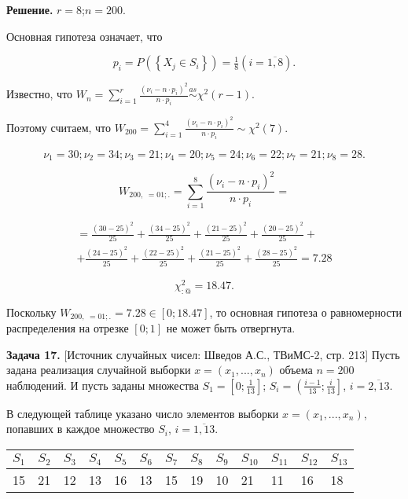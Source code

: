 \textbf{Решение.} $r=8$;$n=200$.

Основная гипотеза означает, что

\[p_{i} =P\left(\left\{X_{j} \in S_{i} \right\}\right)={\tfrac{1}{8}}  \left(i=\overline{1,8}\right).\] 

Известно, что $W_{n} =\sum _{i=1}^{r}\frac{\left(\nu _{i} -n\cdot p_{i} \right)^{2} }{n\cdot p_{i} }  \mathop{\sim }\limits^{as} \chi ^{2} \left(r-1\right)$.

Поэтому считаем, что $W_{200} =\sum _{i=1}^{4}\frac{\left(\nu _{i} -n\cdot p_{i} \right)^{2} }{n\cdot p_{i} }  \sim \chi ^{2} \left(7\right)$.

\[\nu _{1} =30; \nu _{2} =34; \nu _{3} =21; \nu _{4} =20; \nu _{5} =24; \nu _{6} =22; \nu _{7} =21; \nu _{8} =28.\] 



\[W_{200,\; =01;.} =\sum _{i=1}^{8}\frac{\left(\nu _{i} -n\cdot p_{i} \right)^{2} }{n\cdot p_{i} }  =\] 

\[\begin{array}{l} {=\frac{\left(30-25\right)^{2} }{25} +\frac{\left(34-25\right)^{2} }{25} +\frac{\left(21-25\right)^{2} }{25} +\frac{\left(20-25\right)^{2} }{25} +} \\ {+\frac{\left(24-25\right)^{2} }{25} +\frac{\left(22-25\right)^{2} }{25} +\frac{\left(21-25\right)^{2} }{25} +\frac{\left(28-25\right)^{2} }{25} =7.28} \end{array}\] 

\[\chi _{:@}^{2} =18.47.\] 

Поскольку $W_{200,\; =01;.} =7.28\in \left[0;18.47\right]$, то основная гипотеза о равномерности распределения на отрезке $\left[0;1\right]$ не может быть отвергнута.



\textbf{Задача 17.} [Источник случайных чисел: Шведов А.С., ТВиМС-2, стр. 213] Пусть задана реализация случайной выборки $x=\left(x_{1} ,...,x_{n} \right)$ объема $n=200$ наблюдений. И пусть заданы множества $S_{1} =\left[0;{\tfrac{1}{13}} \right]$; $S_{i} =\left({\tfrac{i-1}{13}} ;{\tfrac{i}{13}} \right]$, $i=\overline{2,13}$. 

В следующей таблице указано число элементов выборки $x=\left(x_{1} ,...,x_{n} \right)$, попавших в каждое множество $S_{i} $, $i=\overline{1,13}$.

\begin{tabular}{|p{0.3in}|p{0.3in}|p{0.3in}|p{0.3in}|p{0.3in}|p{0.3in}|p{0.3in}|p{0.3in}|p{0.3in}|p{0.3in}|p{0.3in}|p{0.3in}|p{0.3in}|} \hline 
$S_{1} $ & $S_{2} $ & $S_{3} $ & $S_{4} $ & $S_{5} $ & $S_{6} $ & $S_{7} $ & $S_{8} $ & $S_{9} $ & $S_{10} $ & $S_{11} $ & $S_{12} $ & $S_{13} $ \\ \hline 
15 & 21 & 12 & 13 & 16 & 13 & 15 & 19 & 10 & 21 & 11 & 16 & 18 \\ \hline 
\end{tabular}



